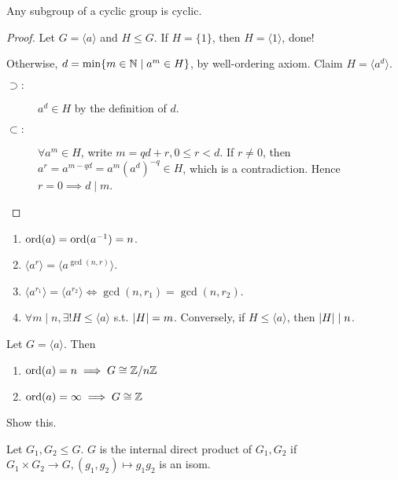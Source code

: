 \begin{prop}
  Any subgroup of a cyclic group is cyclic.
  \begin{proof}
    Let $G = \langle a \rangle$ and $H \le G$. If $H = \{1\}$, then
    $H = \langle 1 \rangle$, done!

    Otherwise, $d = \min \{ m \in \mathbb{N} \mid a^m \in H \}$, by well-ordering
    axiom. Claim $H = \langle a^d \rangle$.
    \begin{description}
      \item[$\supset:$] $a^d \in H$ by the definition of $d$.
      \item[$\subset:$] $\forall a^m \in H$, write $m = qd + r, 0 \le r < d$.
        If $r \ne 0$, then $a^r = a^{m - qd} = a^m (a^d)^{-q} \in H$, which
        is a contradiction. Hence $r = 0 \implies d \mid m$.
    \end{description}
  \end{proof}
\end{prop}

\begin{exercise} \mbox{}
  \begin{enumerate}
    \item $\operatorname{ord}(a) = \operatorname{ord}(a^{-1}) = n$.
    \item $\langle a^r \rangle = \langle a^{\gcd(n, r)} \rangle$.
    \item $\langle a^{r_1} \rangle = \langle a^{r_2} \rangle \iff
      \gcd(n, r_1) = \gcd(n, r_2)$.
    \item $\forall m \mid n, \exists! H \le \langle a \rangle$ s.t.
      $\lvert H\rvert = m$. Conversely, if $H \le \langle a \rangle$, then
      $\lvert H\rvert \mid n$.
  \end{enumerate}
\end{exercise}

\begin{prop}
  Let $G = \langle a \rangle$. Then
  \begin{enumerate}
    \item $\operatorname{ord}(a) = n \implies G \cong \mathbb{Z}/n\mathbb{Z}$
    \item $\operatorname{ord}(a) = \infty \implies G \cong \mathbb{Z}$
  \end{enumerate}
  \begin{exercise}
    Show this.
  \end{exercise}
\end{prop}

\begin{definition}
  Let $G_1, G_2 \le G$. $G$ is the internal direct product of $G_1, G_2$ if
  $G_1 \times G_2 \to G, (g_1, g_2) \mapsto g_1g_2$ is an isom.
\end{definition}

